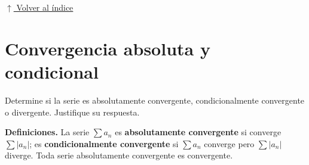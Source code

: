 \documentclass[12pt]{article}
\newcommand{\volverindice}{%
    \vspace{1em}%
    \begin{flushright}%
        \hyperlink{indice}{\small $\uparrow$ Volver al índice}%
    \end{flushright}%
}
\begin{document}
\volverindice
\newpage


\section{Convergencia absoluta y condicional}

Determine si la serie es absolutamente convergente, condicionalmente
convergente o divergente. Justifique su respuesta.

\vspace{0.5em}
\textbf{Definiciones.} La serie $\sum a_n$ es \textbf{absolutamente
convergente} si converge $\sum|a_n|$; es \textbf{condicionalmente convergente}
si $\sum a_n$ converge pero $\sum|a_n|$ diverge. Toda serie absolutamente
convergente es convergente.
\end{document}
